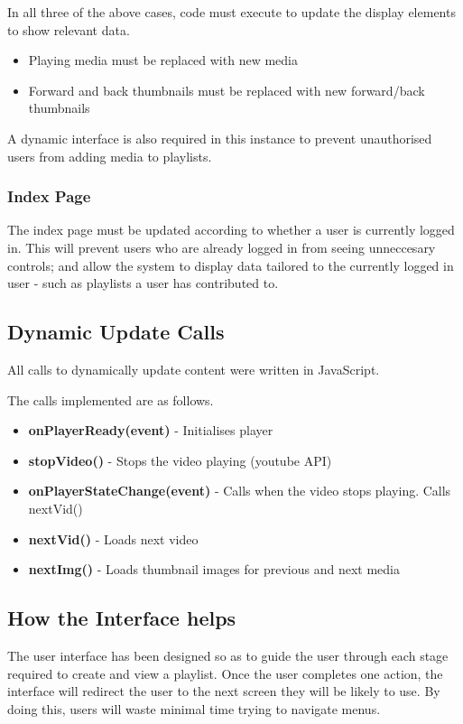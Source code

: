 \documentclass{sig-alt-release2}
\begin{document}
In all three of the above cases, code must execute to update the display elements to show relevant data.
\begin{itemize}
\item Playing media must be replaced with new media
\item Forward and back thumbnails must be replaced with new forward/back thumbnails
\end{itemize}

A dynamic interface is also required in this instance to prevent unauthorised users from adding media to playlists.

\subsubsection{Index Page}
The index page must be updated according to whether a user is currently logged in. This will prevent users who are already logged in from seeing unneccesary controls; and allow the system to display data tailored to the currently logged in user - such as playlists a user has contributed to. 

\subsection{Dynamic Update Calls}
All calls to dynamically update content were written in JavaScript.

The calls implemented are as follows.

\begin{itemize}
\item \textbf{onPlayerReady(event)} - Initialises player
\item \textbf{stopVideo()} - Stops the video playing (youtube API)
\item \textbf{onPlayerStateChange(event)} - Calls when the video stops playing. Calls nextVid()
\item \textbf{nextVid()} - Loads next video
\item \textbf{nextImg()} - Loads thumbnail images for previous and next media
\end{itemize}

\subsection{How the Interface helps}
The user interface has been designed so as to guide the user through each stage required to create and view a playlist. Once the user completes one action, the interface will redirect the user to the next screen they will be likely to use. By doing this, users will waste minimal time trying to navigate menus. 
\end{document}
